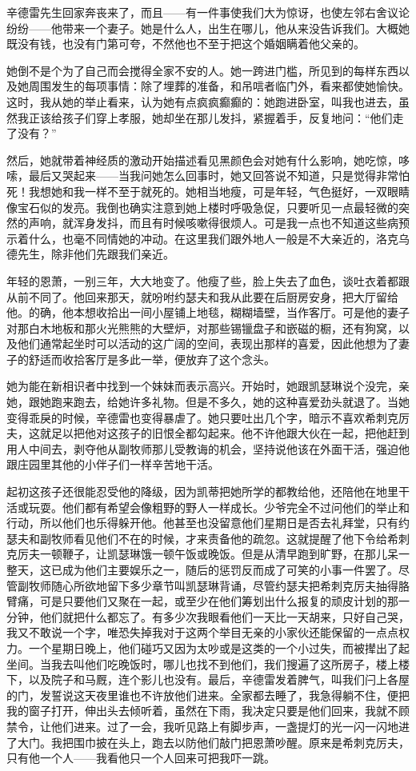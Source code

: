 \par 辛德雷先生回家奔丧来了，而且——有一件事使我们大为惊讶，也使左邻右舍议论纷纷——他带来一个妻子。她是什么人，出生在哪儿，他从来没告诉我们。大概她既没有钱，也没有门第可夸，不然他也不至于把这个婚姻瞒着他父亲的。
\par 她倒不是个为了自己而会搅得全家不安的人。她一跨进门槛，所见到的每样东西以及她周围发生的每项事情：除了埋葬的准备，和吊唁者临门外，看来都使她愉快。这时，我从她的举止看来，认为她有点疯疯癫癫的：她跑进卧室，叫我也进去，虽然我正该给孩子们穿上孝服，她却坐在那儿发抖，紧握着手，反复地问：“他们走了没有？”
\par 然后，她就带着神经质的激动开始描述看见黑颜色会对她有什么影响，她吃惊，哆嗦，最后又哭起来——当我问她怎么回事时，她又回答说不知道，只是觉得非常怕死！我想她和我一样不至于就死的。她相当地瘦，可是年轻，气色挺好，一双眼睛像宝石似的发亮。我倒也确实注意到她上楼时呼吸急促，只要听见一点最轻微的突然的声响，就浑身发抖，而且有时候咳嗽得很烦人。可是我一点也不知道这些病预示着什么，也毫不同情她的冲动。在这里我们跟外地人一般是不大亲近的，洛克乌德先生，除非他们先跟我们亲近。
\par 年轻的恩萧，一别三年，大大地变了。他瘦了些，脸上失去了血色，谈吐衣着都跟从前不同了。他回来那天，就吩咐约瑟夫和我从此要在后厨房安身，把大厅留给他。的确，他本想收拾出一间小屋铺上地毯，糊糊墙壁，当作客厅。可是他的妻子对那白木地板和那火光熊熊的大壁炉，对那些锡镴盘子和嵌磁的橱，还有狗窝，以及他们通常起坐时可以活动的这广阔的空间，表现出那样的喜爱，因此他想为了妻子的舒适而收拾客厅是多此一举，便放弃了这个念头。
\par 她为能在新相识者中找到一个妹妹而表示高兴。开始时，她跟凯瑟琳说个没完，亲她，跟她跑来跑去，给她许多礼物。但是不多久，她的这种喜爱劲头就退了。当她变得乖戾的时候，辛德雷也变得暴虐了。她只要吐出几个字，暗示不喜欢希刺克厉夫，这就足以把他对这孩子的旧恨全都勾起来。他不许他跟大伙在一起，把他赶到用人中间去，剥夺他从副牧师那儿受教诲的机会，坚持说他该在外面干活，强迫他跟庄园里其他的小伴子们一样辛苦地干活。
\par 起初这孩子还很能忍受他的降级，因为凯蒂把她所学的都教给他，还陪他在地里干活或玩耍。他们都有希望会像粗野的野人一样成长。少爷完全不过问他们的举止和行动，所以他们也乐得躲开他。他甚至也没留意他们星期日是否去礼拜堂，只有约瑟夫和副牧师看见他们不在的时候，才来责备他的疏忽。这就提醒了他下令给希刺克厉夫一顿鞭子，让凯瑟琳饿一顿午饭或晚饭。但是从清早跑到旷野，在那儿呆一整天，这已成为他们主要娱乐之一，随后的惩罚反而成了可笑的小事一件罢了。尽管副牧师随心所欲地留下多少章节叫凯瑟琳背诵，尽管约瑟夫把希刺克厉夫抽得胳臂痛，可是只要他们又聚在一起，或至少在他们筹划出什么报复的顽皮计划的那一分钟，他们就把什么都忘了。有多少次我眼看他们一天比一天胡来，只好自己哭，我又不敢说一个字，唯恐失掉我对于这两个举目无亲的小家伙还能保留的一点点权力。一个星期日晚上，他们碰巧又因为太吵或是这类的一个小过失，而被撵出了起坐间。当我去叫他们吃晚饭时，哪儿也找不到他们，我们搜遍了这所房子，楼上楼下，以及院子和马厩，连个影儿也没有。最后，辛德雷发着脾气，叫我们闩上各屋的门，发誓说这天夜里谁也不许放他们进来。全家都去睡了，我急得躺不住，便把我的窗子打开，伸出头去倾听着，虽然在下雨，我决定只要是他们回来，我就不顾禁令，让他们进来。过了一会，我听见路上有脚步声，一盏提灯的光一闪一闪地进了大门。我把围巾披在头上，跑去以防他们敲门把恩萧吵醒。原来是希刺克厉夫，只有他一个人——我看他只一个人回来可把我吓一跳。
